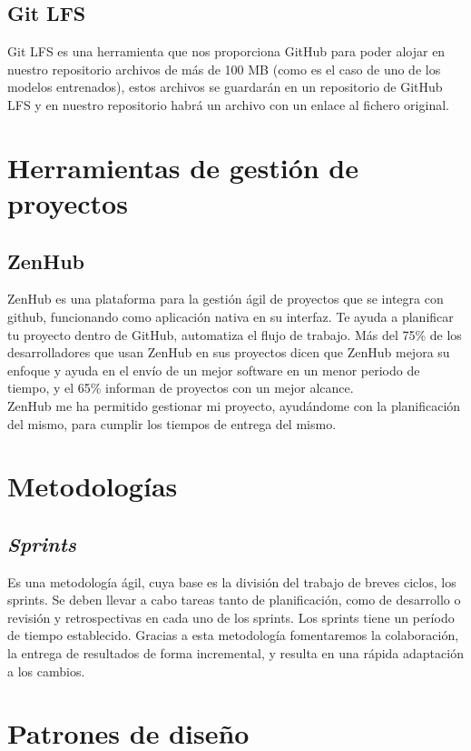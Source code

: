 \subsection{Git LFS}
Git LFS es una herramienta que nos proporciona GitHub para poder alojar en nuestro repositorio archivos de más de 100 MB (como es el caso de uno de los modelos entrenados), estos archivos se guardarán en un repositorio de GitHub LFS y en nuestro repositorio habrá un archivo con un enlace al fichero original.

\section{Herramientas de gestión de proyectos}

\subsection{ZenHub}

ZenHub es una plataforma para la gestión ágil de proyectos que se integra con github, funcionando como aplicación nativa en su interfaz. Te ayuda a planificar tu proyecto dentro de GitHub, automatiza el flujo de trabajo. Más del 75\% de los desarrolladores que usan ZenHub en sus proyectos dicen que ZenHub mejora su enfoque y ayuda en el envío de un mejor software en un menor periodo de tiempo, y el 65\% informan de proyectos con un mejor alcance.\\
ZenHub me ha permitido gestionar mi proyecto, ayudándome con la planificación del mismo, para cumplir los tiempos de entrega del mismo.

\section{Metodologías}

\subsection{\textit{Sprints}}
Es una metodología ágil, cuya base es la división del trabajo de breves ciclos, los sprints. Se deben llevar a cabo tareas tanto de planificación, como de desarrollo o revisión y retrospectivas en cada uno de los sprints. Los sprints tiene un período de tiempo establecido. Gracias a esta metodología fomentaremos la colaboración, la entrega de resultados de forma incremental, y resulta en una rápida adaptación a los cambios.

\section{Patrones de diseño}

